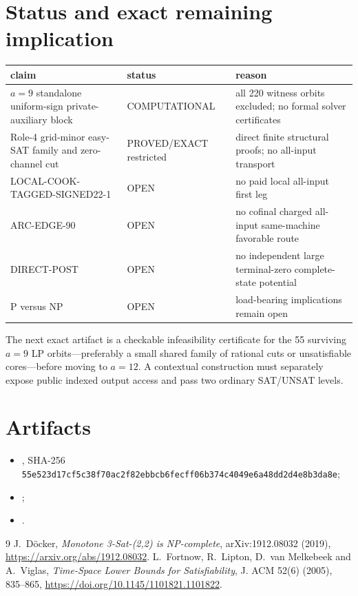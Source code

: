 \documentclass[11pt]{article}
\begin{document}
\section{Status and exact remaining implication}
\begin{center}
\begin{tabular}{p{.47\linewidth}p{.18\linewidth}p{.27\linewidth}}
\toprule
claim & status & reason\\
\midrule
$a=9$ standalone uniform-sign private-auxiliary block & COMPUTATIONAL & all 220 witness orbits excluded; no formal solver certificates\\
Role-4 grid-minor easy-SAT family and zero-channel cut & PROVED/EXACT restricted & direct finite structural proofs; no all-input transport\\
LOCAL-COOK-TAGGED-SIGNED22-1 & OPEN & no paid local all-input first leg\\
ARC-EDGE-90 & OPEN & no cofinal charged all-input same-machine favorable route\\
DIRECT-POST & OPEN & no independent large terminal-zero complete-state potential\\
P versus NP & OPEN & load-bearing implications remain open\\
\bottomrule
\end{tabular}
\end{center}

The next exact artifact is a checkable infeasibility certificate for the 55
surviving $a=9$ LP orbits---preferably a small shared family of rational cuts
or unsatisfiable cores---before moving to $a=12$.  A contextual construction
must separately expose public indexed output access and pass two ordinary
SAT/UNSAT levels.

\section{Artifacts}
\begin{itemize}
\item {}, SHA-256 \texttt{55e523d17cf5c38f70ac2f82ebbcb6fecff06b374c4049e6a48dd2d4e8b3da8e};
\item {};
\item {}.
\end{itemize}

\begin{thebibliography}{9}
 J.~D\"ocker, \emph{Monotone 3-Sat-(2,2) is NP-complete}, arXiv:1912.08032 (2019), \url{https://arxiv.org/abs/1912.08032}.
 L.~Fortnow, R.~Lipton, D.~van Melkebeek and A.~Viglas, \emph{Time-Space Lower Bounds for Satisfiability}, J. ACM 52(6) (2005), 835--865, \url{https://doi.org/10.1145/1101821.1101822}.
\end{thebibliography}
\end{document}
